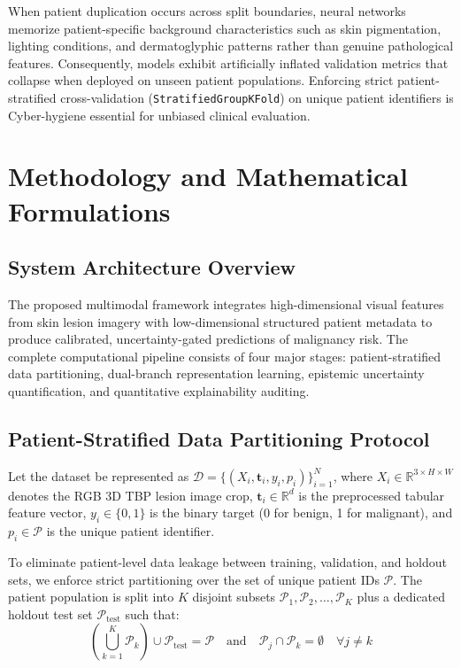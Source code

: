 \documentclass[12pt,a4paper]{report}
\begin{document}
	When patient duplication occurs across split boundaries, neural networks memorize patient-specific background characteristics such as skin pigmentation, lighting conditions, and dermatoglyphic patterns rather than genuine pathological features. Consequently, models exhibit artificially inflated validation metrics that collapse when deployed on unseen patient populations. Enforcing strict patient-stratified cross-validation (\texttt{StratifiedGroupKFold}) on unique patient identifiers is Cyber-hygiene essential for unbiased clinical evaluation.
	
	\chapter{Methodology and Mathematical Formulations}
	\label{ch:methodology}
	
	\section{System Architecture Overview}
	The proposed multimodal framework integrates high-dimensional visual features from skin lesion imagery with low-dimensional structured patient metadata to produce calibrated, uncertainty-gated predictions of malignancy risk. The complete computational pipeline consists of four major stages: patient-stratified data partitioning, dual-branch representation learning, epistemic uncertainty quantification, and quantitative explainability auditing.
	
	\section{Patient-Stratified Data Partitioning Protocol}
	Let the dataset be represented as $\mathcal{D} = \{(X_i, \mathbf{t}_i, y_i, p_i)\}_{i=1}^N$, where $X_i \in \mathbb{R}^{3 \times H \times W}$ denotes the RGB 3D TBP lesion image crop, $\mathbf{t}_i \in \mathbb{R}^d$ is the preprocessed tabular feature vector, $y_i \in \{0, 1\}$ is the binary target (0 for benign, 1 for malignant), and $p_i \in \mathcal{P}$ is the unique patient identifier. 
	
	To eliminate patient-level data leakage between training, validation, and holdout sets, we enforce strict partitioning over the set of unique patient IDs $\mathcal{P}$. The patient population is split into $K$ disjoint subsets $\mathcal{P}_1, \mathcal{P}_2, \dots, \mathcal{P}_K$ plus a dedicated holdout test set $\mathcal{P}_{\text{test}}$ such that:
	\begin{equation}
		\left( \bigcup_{k=1}^K \mathcal{P}_k \right) \cup \mathcal{P}_{\text{test}} = \mathcal{P} \quad \text{and} \quad \mathcal{P}_j \cap \mathcal{P}_k = \emptyset \quad \forall j \neq k
	\end{equation}
	
\end{document}
